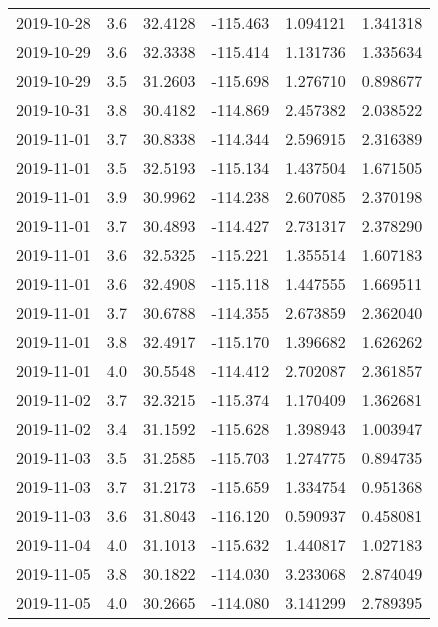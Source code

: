 \begin{tabular}{lrrrrr}
2019-10-28 &       3.6 &  32.4128 &  -115.463 &         1.094121 &         1.341318 \\
2019-10-29 &       3.6 &  32.3338 &  -115.414 &         1.131736 &         1.335634 \\
2019-10-29 &       3.5 &  31.2603 &  -115.698 &         1.276710 &         0.898677 \\
2019-10-31 &       3.8 &  30.4182 &  -114.869 &         2.457382 &         2.038522 \\
2019-11-01 &       3.7 &  30.8338 &  -114.344 &         2.596915 &         2.316389 \\
2019-11-01 &       3.5 &  32.5193 &  -115.134 &         1.437504 &         1.671505 \\
2019-11-01 &       3.9 &  30.9962 &  -114.238 &         2.607085 &         2.370198 \\
2019-11-01 &       3.7 &  30.4893 &  -114.427 &         2.731317 &         2.378290 \\
2019-11-01 &       3.6 &  32.5325 &  -115.221 &         1.355514 &         1.607183 \\
2019-11-01 &       3.6 &  32.4908 &  -115.118 &         1.447555 &         1.669511 \\
2019-11-01 &       3.7 &  30.6788 &  -114.355 &         2.673859 &         2.362040 \\
2019-11-01 &       3.8 &  32.4917 &  -115.170 &         1.396682 &         1.626262 \\
2019-11-01 &       4.0 &  30.5548 &  -114.412 &         2.702087 &         2.361857 \\
2019-11-02 &       3.7 &  32.3215 &  -115.374 &         1.170409 &         1.362681 \\
2019-11-02 &       3.4 &  31.1592 &  -115.628 &         1.398943 &         1.003947 \\
2019-11-03 &       3.5 &  31.2585 &  -115.703 &         1.274775 &         0.894735 \\
2019-11-03 &       3.7 &  31.2173 &  -115.659 &         1.334754 &         0.951368 \\
2019-11-03 &       3.6 &  31.8043 &  -116.120 &         0.590937 &         0.458081 \\
2019-11-04 &       4.0 &  31.1013 &  -115.632 &         1.440817 &         1.027183 \\
2019-11-05 &       3.8 &  30.1822 &  -114.030 &         3.233068 &         2.874049 \\
2019-11-05 &       4.0 &  30.2665 &  -114.080 &         3.141299 &         2.789395 \\

\end{tabular}
